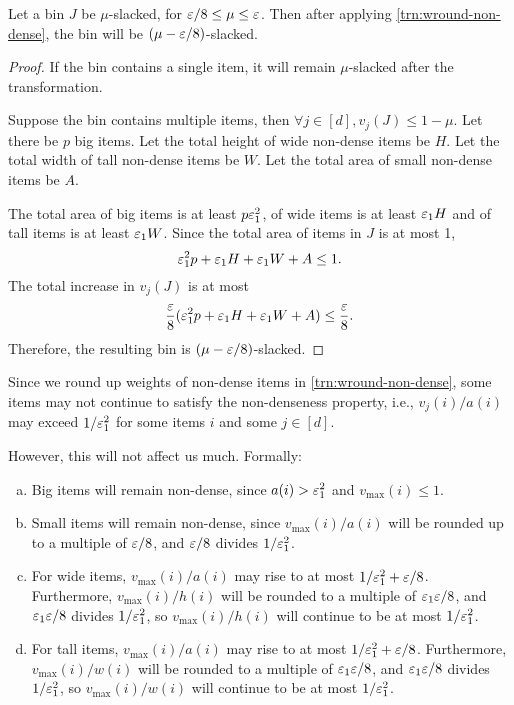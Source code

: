 \begin{lemma}
\label{lem:wround-non-dense-slackness}
Let a bin $J$ be $\mu$-slacked, for $\varepsilon/8 \le \mu \le \varepsilon$.
Then after applying \cref{trn:wround-non-dense},
the bin will be $(\mu - \varepsilon/8)$-slacked.
\end{lemma}
\begin{proof}
If the bin contains a single item, it will remain $\mu$-slacked after the transformation.

Suppose the bin contains multiple items, then $\forall j \in [d], v_j(J) \le 1-\mu$.
Let there be $p$ big items.
Let the total height of wide non-dense items be $H$.
Let the total width of tall non-dense items be $W$.
Let the total area of small non-dense items be $A$.

The total area of big items is at least $p\varepsilon_1^2$,
of wide items is at least $\varepsilon_1 H$
and of tall items is at least $\varepsilon_1 W$.
Since the total area of items in $J$ is at most 1,
\[ \varepsilon_1^2p + \varepsilon_1 H + \varepsilon_1 W + A \le 1. \]
The total increase in $v_j(J)$ is at most
\[ \frac{\varepsilon}{8}(\varepsilon_1^2p + \varepsilon_1 H + \varepsilon_1 W + A) \le \frac{\varepsilon}{8}. \]
Therefore, the resulting bin is $(\mu - \varepsilon/8)$-slacked.
\end{proof}

\begin{observation}
\label{obs:non-dense-vinc}
Since we round up weights of non-dense items in \cref{trn:wround-non-dense},
some items may not continue to satisfy the non-denseness property,
i.e., $v_j(i)/a(i)$ may exceed $1/\varepsilon_1^2$ for some items $i$ and some $j \in [d]$.

However, this will not affect us much. Formally:
\begin{enumerate}[(a)]
\item Big items will remain non-dense, since $a(i) > \varepsilon_1^2$ and $v_{\max}(i) \le 1$.
\item Small items will remain non-dense, since $v_{\max}(i)/a(i)$ will be rounded up to
a multiple of $\varepsilon/8$, and $\varepsilon/8$ divides $1/\varepsilon_1^2$.
\item For wide items, $v_{\max}(i)/a(i)$ may rise to at most $1/\varepsilon_1^2 + \varepsilon/8$.
Furthermore, $v_{\max}(i)/h(i)$ will be rounded to a multiple of $\varepsilon_1\varepsilon/8$,
and $\varepsilon_1\varepsilon/8$ divides $1/\varepsilon_1^2$, so $v_{\max}(i)/h(i)$ will continue to be
at most $1/\varepsilon_1^2$.
\item \label{item:non-dense-vinc:tall} For tall items,
$v_{\max}(i)/a(i)$ may rise to at most $1/\varepsilon_1^2 + \varepsilon/8$.
Furthermore, $v_{\max}(i)/w(i)$ will be rounded to a multiple of $\varepsilon_1\varepsilon/8$,
and $\varepsilon_1\varepsilon/8$ divides $1/\varepsilon_1^2$, so $v_{\max}(i)/w(i)$ will continue to be
at most $1/\varepsilon_1^2$.
\end{enumerate}
\end{observation}

